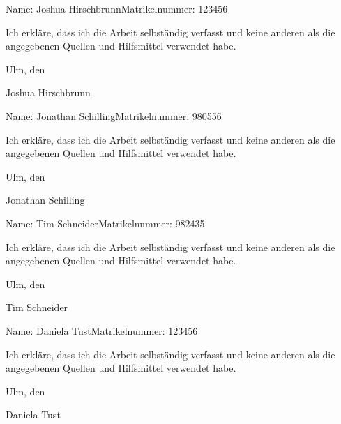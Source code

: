 \documentclass[a4paper,
10pt,
headsepline,           %
twoside,
openright,
pointlessnumbers,      %
bibtotoc,              %
chapterprefix,
DIV=9,                
]{scrbook}
\newcommand{\fullnameA}{Joshua Hirschbrunn}
\newcommand{\fullnameB}{Jonathan Schilling}
\newcommand{\fullnameC}{Tim Schneider}
\newcommand{\fullnameD}{Daniela Tust}
\newcommand{\matnrA}{123456}%
\newcommand{\matnrB}{980556}
\newcommand{\matnrC}{982435}
\newcommand{\matnrD}{123456}%
\begin{document}


\tableofcontents

\mainmatter


\appendix

\backmatter
\printglossaries

\clearpage
\thispagestyle{empty}

Name: \fullnameA \hfill Matrikelnummer: \matnrA \vspace{2cm}


Ich erkläre, dass ich die Arbeit selbständig verfasst und keine anderen als die angegebenen Quellen und Hilfsmittel verwendet habe.\vspace{2cm}

Ulm, den \dotfill

\hspace{10cm} {\footnotesize \fullnameA}

\clearpage
\thispagestyle{empty}

Name: \fullnameB \hfill Matrikelnummer: \matnrB \vspace{2cm}


Ich erkläre, dass ich die Arbeit selbständig verfasst und keine anderen als die angegebenen Quellen und Hilfsmittel verwendet habe.\vspace{2cm}

Ulm, den \dotfill

\hspace{10cm} {\footnotesize \fullnameB}

\clearpage
\thispagestyle{empty}

Name: \fullnameC \hfill Matrikelnummer: \matnrC \vspace{2cm}


Ich erkläre, dass ich die Arbeit selbständig verfasst und keine anderen als die angegebenen Quellen und Hilfsmittel verwendet habe.\vspace{2cm}

Ulm, den \dotfill

\hspace{10cm} {\footnotesize \fullnameC}

\clearpage
\thispagestyle{empty}

Name: \fullnameD \hfill Matrikelnummer: \matnrD \vspace{2cm}


Ich erkläre, dass ich die Arbeit selbständig verfasst und keine anderen als die angegebenen Quellen und Hilfsmittel verwendet habe.\vspace{2cm}

Ulm, den \dotfill

\hspace{10cm} {\footnotesize \fullnameD}
\end{document}

